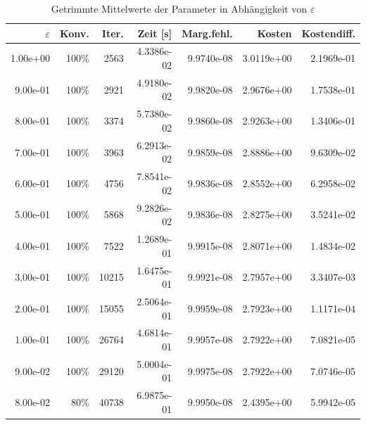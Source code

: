\begin{table}[htbp]
\caption{Getrimmte Mittelwerte der Parameter in Abhängigkeit von $\varepsilon$}
\label{tab:Parametertest128_tol1e-07}
\small
\centering
{}
\begin{tabular}{rrrrrrr}
\toprule
$\varepsilon$ & Konv. & Iter. & Zeit [s] & Marg.fehl. & Kosten & Kostendiff. \\
\midrule
1.00e+00 & 100\% & 2563 & 4.3386e-02 & 9.9740e-08 & 3.0119e+00 & 2.1969e-01 \\
9.00e-01 & 100\% & 2921 & 4.9180e-02 & 9.9820e-08 & 2.9676e+00 & 1.7538e-01 \\
8.00e-01 & 100\% & 3374 & 5.7380e-02 & 9.9860e-08 & 2.9263e+00 & 1.3406e-01 \\
7.00e-01 & 100\% & 3963 & 6.2913e-02 & 9.9859e-08 & 2.8886e+00 & 9.6309e-02 \\
6.00e-01 & 100\% & 4756 & 7.8541e-02 & 9.9836e-08 & 2.8552e+00 & 6.2958e-02 \\
5.00e-01 & 100\% & 5868 & 9.2826e-02 & 9.9836e-08 & 2.8275e+00 & 3.5241e-02 \\
4.00e-01 & 100\% & 7522 & 1.2689e-01 & 9.9915e-08 & 2.8071e+00 & 1.4834e-02 \\
3.00e-01 & 100\% & 10215 & 1.6475e-01 & 9.9921e-08 & 2.7957e+00 & 3.3407e-03 \\
2.00e-01 & 100\% & 15055 & 2.5064e-01 & 9.9959e-08 & 2.7923e+00 & 1.1171e-04 \\
1.00e-01 & 100\% & 26764 & 4.6814e-01 & 9.9957e-08 & 2.7922e+00 & 7.0821e-05 \\
9.00e-02 & 100\% & 29120 & 5.0004e-01 & 9.9975e-08 & 2.7922e+00 & 7.0746e-05 \\
8.00e-02 & 80\% & 40738 & 6.9875e-01 & 9.9950e-08 & 2.4395e+00 & 5.9942e-05 \\
\bottomrule
\end{tabular}
\end{table}
